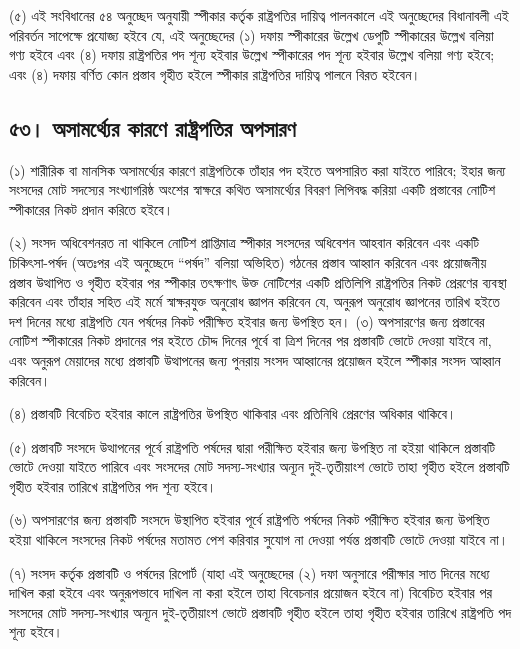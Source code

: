 \documentclass[11pt]{article}
\begin{document}
(৫) এই সংবিধানের ৫৪ অনুচ্ছেদ অনুযায়ী স্পীকার কর্তৃক রাষ্ট্রপতির দায়িত্ব
    পালনকালে এই অনুচ্ছেদের বিধানাবলী এই পরিবর্তন সাপেক্ষে প্রযোজ্য হইবে যে, এই
    অনুচ্ছেদের (১) দফায় স্পীকারের উল্লেখ ডেপুটি স্পীকারের উল্লেখ বলিয়া গণ্য হইবে
    এবং (৪) দফায় রাষ্ট্রপতির পদ শূন্য হইবার উল্লেখ স্পীকারের পদ শূন্য হইবার উল্লেখ
    বলিয়া গণ্য হইবে; এবং (৪) দফায় বর্ণিত কোন প্রস্তাব গৃহীত হইলে স্পীকার
    রাষ্ট্রপতির দায়িত্ব পালনে বিরত হইবেন।

\subsection{৫৩। অসামর্থ্যের কারণে রাষ্ট্রপতির অপসারণ}
\label{sec:org19b33d9}
(১) শারীরিক বা মানসিক অসামর্থ্যের কারণে রাষ্ট্রপতিকে তাঁহার পদ হইতে অপসারিত
    করা যাইতে পারিবে; ইহার জন্য সংসদের মোট সদস্যের সংখ্যাগরিষ্ঠ অংশের স্বাক্ষরে
    কথিত অসামর্থ্যের বিবরণ লিপিবদ্ধ করিয়া একটি প্রস্তাবের নোটিশ স্পীকারের নিকট
    প্রদান করিতে হইবে।

(২) সংসদ অধিবেশনরত না থাকিলে নোটিশ প্রাপ্তিমাত্র স্পীকার সংসদের অধিবেশন
    আহবান করিবেন এবং একটি চিকিৎসা-পর্ষদ (অতঃপর এই অনুচ্ছেদে “পর্ষদ” বলিয়া
    অভিহিত) গঠনের প্রস্তাব আহ্বান করিবেন এবং প্রয়োজনীয় প্রস্তাব উত্থাপিত ও গৃহীত
    হইবার পর স্পীকার তৎক্ষণাৎ উক্ত নোটিশের একটি প্রতিলিপি রাষ্ট্রপতির নিকট
    প্রেরণের ব্যবস্থা করিবেন এবং তাঁহার সহিত এই মর্মে স্বাক্ষরযুক্ত অনুরোধ জ্ঞাপন
    করিবেন যে, অনুরূপ অনুরোধ জ্ঞাপনের তারিখ হইতে দশ দিনের মধ্যে রাষ্ট্রপতি যেন
    পর্ষদের নিকট পরীক্ষিত হইবার জন্য উপস্থিত হন।
(৩) অপসারণের জন্য প্রস্তাবের নোটিশ স্পীকারের নিকট প্রদানের পর হইতে চৌদ্দ
    দিনের পূর্বে বা ত্রিশ দিনের পর প্রস্তাবটি ভোটে দেওয়া যাইবে না, এবং অনুরূপ
    মেয়াদের মধ্যে প্রস্তাবটি উত্থাপনের জন্য পুনরায় সংসদ আহ্বানের প্রয়োজন হইলে
    স্পীকার সংসদ আহ্বান করিবেন।

(৪) প্রস্তাবটি বিবেচিত হইবার কালে রাষ্ট্রপতির উপস্থিত থাকিবার এবং প্রতিনিধি
    প্রেরণের অধিকার থাকিবে।

(৫) প্রস্তাবটি সংসদে উত্থাপনের পূর্বে রাষ্ট্রপতি পর্ষদের দ্বারা পরীক্ষিত হইবার
    জন্য উপস্থিত না হইয়া থাকিলে প্রস্তাবটি ভোটে দেওয়া যাইতে পারিবে এবং সংসদের
    মোট সদস্য-সংখ্যার অন্যূন দুই-তৃতীয়াংশ ভোটে তাহা গৃহীত হইলে প্রস্তাবটি গৃহীত
    হইবার তারিখে রাষ্ট্রপতির পদ শূন্য হইবে।

(৬) অপসারণের জন্য প্রস্তাবটি সংসদে উস্থাপিত হইবার পূর্বে রাষ্ট্রপতি পর্ষদের
    নিকট পরীক্ষিত হইবার জন্য উপস্থিত হইয়া থাকিলে সংসদের নিকট পর্ষদের মতামত পেশ
    করিবার সুযোগ না দেওয়া পর্যন্ত প্রস্তাবটি ভোটে দেওয়া যাইবে না।

(৭) সংসদ কর্তৃক প্রস্তাবটি ও পর্ষদের রিপোর্ট (যাহা এই অনুচ্ছেদের (২) দফা
    অনুসারে পরীক্ষার সাত দিনের মধ্যে দাখিল করা হইবে এবং অনুরূপভাবে দাখিল না করা
    হইলে তাহা বিবেচনার প্রয়োজন হইবে না) বিবেচিত হইবার পর সংসদের মোট
    সদস্য-সংখ্যার অন্যূন দুই-তৃতীয়াংশ ভোটে প্রস্তাবটি গৃহীত হইলে তাহা গৃহীত হইবার
    তারিখে রাষ্ট্রপতি পদ শূন্য হইবে।
\end{document}
